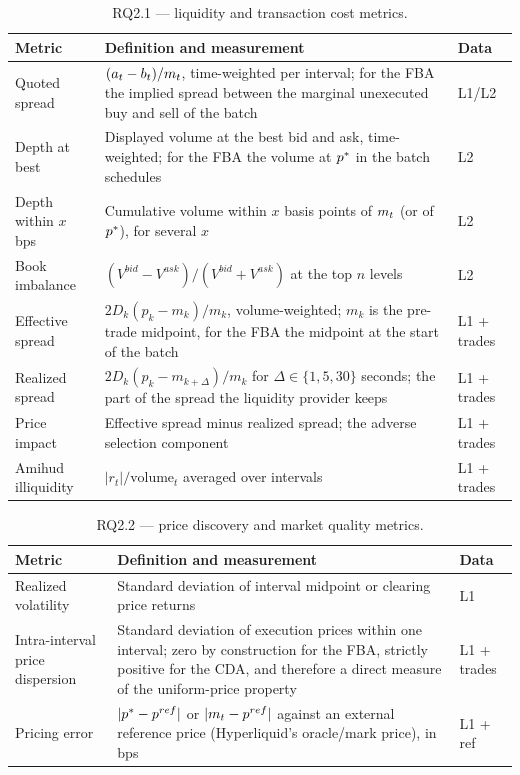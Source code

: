 \begin{table}[htbp]
\centering
\caption[Metrics for RQ2.1]{RQ2.1 --- liquidity and transaction cost
metrics.}
\label{tab:metrics1}
\small
\begin{tabularx}{\textwidth}{@{}p{3.1cm} L p{1.6cm}@{}}
\toprule
\textbf{Metric} & \textbf{Definition and measurement} & \textbf{Data}\\
\midrule
Quoted spread & $(a_t-b_t)/m_{t}$, time-weighted per interval; for the
FBA the implied spread between the marginal unexecuted buy and sell of
the batch & L1/L2\\
Depth at best & Displayed volume at the best bid and ask, time-weighted;
for the FBA the volume at $p^{\ast}$ in the batch schedules & L2\\
Depth within $x$ bps & Cumulative volume within $x$ basis points of
$m_{t}$ (or of $p^{\ast}$), for several $x$ & L2\\
Book imbalance & $(V^{bid}-V^{ask})/(V^{bid}+V^{ask})$ at the top $n$
levels & L2\\
Effective spread & $2D_k(p_k-m_k)/m_k$, volume-weighted; $m_k$ is the
pre-trade midpoint, for the FBA the midpoint at the start of the batch
& L1 + trades\\
Realized spread & $2D_k(p_k-m_{k+\Delta})/m_k$ for
$\Delta \in \{1,5,30\}$ seconds; the part of the spread the liquidity
provider keeps & L1 + trades\\
Price impact & Effective spread minus realized spread; the adverse
selection component & L1 + trades\\
Amihud illiquidity & $|r_t|/\text{volume}_t$ averaged over intervals &
L1 + trades\\
\bottomrule
\end{tabularx}
\end{table}

\begin{table}[htbp]
\centering
\caption[Metrics for RQ2.2]{RQ2.2 --- price discovery and market quality
metrics.}
\label{tab:metrics2}
\small
\begin{tabularx}{\textwidth}{@{}p{3.1cm} L p{1.6cm}@{}}
\toprule
\textbf{Metric} & \textbf{Definition and measurement} & \textbf{Data}\\
\midrule
Realized volatility & Standard deviation of interval midpoint or
clearing price returns & L1\\
Intra-interval price dispersion & Standard deviation of execution prices
within one interval; zero by construction for the FBA, strictly positive
for the CDA, and therefore a direct measure of the uniform-price
property & L1 + trades\\
Pricing error & $|p^{\ast}-p^{ref}|$ or $|m_{t}-p^{ref}|$ against an
external reference price (Hyperliquid's oracle/mark price), in bps &
L1 + ref\\
\bottomrule
\end{tabularx}
\end{table}

